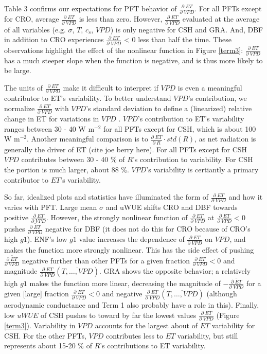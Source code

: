 \documentclass[draft,linenumbers]{agujournal}
\begin{document}
Table 3 confirms our expectations for PFT behavior of $\frac{\partial \; ET}{\partial \; VPD}$. For all PFTs except for CRO, average $\frac{\partial \; ET}{\partial \; VPD}$ is less than zero. However, $\frac{\partial \; ET}{\partial \; VPD}$ evaluated at the average of all variables (e.g. $\sigma$, $T$, $c_s$, $VPD$) is only negative for CSH and GRA. And, DBF in addition to CRO experiences $\frac{\partial \; ET}{\partial \; VPD}$ < 0 less than half the time. These observations highlight the effect of the nonlinear function in Figure \ref{term3}: $\frac{\partial \; ET}{\partial \; VPD}$ has a much steeper slope when the function is negative, and is thus more likely to be large.

The units of $\frac{\partial \; ET}{\partial \; VPD}$ make it difficult to interpret if $VPD$ is even a meaningful contributor to ET's variability. To better understand $VPD$'s contribution, we normalize $\frac{\partial \; ET}{\partial \; VPD}$ with $VPD$'s standard deviation to define a (linearized) relative change in ET for variations in $VPD$ . $VPD$'s contribution to ET's variability ranges between 30 - 40 W m$^{-2}$ for all PFTs except for CSH, which is about 100 W m$^{-2}$. Another meaningful comparison is to $\frac{\partial \; ET}{\partial \; R} \cdot std(R)$, as net radiation is generally the driver of ET (cite joe berry here). For all PFTs except for CSH $VPD$ contributes between 30 - 40 \% of $R$'s contribution to variability. For CSH the portion is much larger, about 88 \%. $VPD$'s variability is certiantly a primary contributor to $ET$'s variability.

So far, idealized plots and statistics have illuminated the form of $\frac{\partial \; ET}{\partial \; VPD}$ and how it varies with PFT. Large mean $\sigma$ and uWUE shifts CRO and DBF towards positive $\frac{\partial \; ET}{\partial \; VPD}$. However, the strongly nonlinear function of $\frac{\partial \; ET}{\partial \; VPD}$ at $\frac{\partial \; ET}{\partial \; VPD} < 0$ pushes $\overline{\frac{\partial \; ET}{\partial \; VPD}}$ negative for DBF (it does not do this for CRO because of CRO's high $g1$). ENF's low $g1$ value increases the dependence of $\frac{\partial \; ET}{\partial \; VPD}$ on $VPD$, and makes the function more strongly nonlinear. This has the side effect of pushing $\overline{\frac{\partial \; ET}{\partial \; VPD}}$ negative further than other PFTs for a given fraction $\frac{\partial \; ET}{\partial \; VPD} < 0$ and magnitude $\frac{\partial \; ET}{\partial \; VPD}(\overline{T,\ldots,VPD})$. GRA shows the opposite behavior; a relatively high $g1$  makes the function more linear, decreasing the magnitude of $-\overline{\frac{\partial \; ET}{\partial \; VPD}}$ for a given  [large] fraction $\frac{\partial \; ET}{\partial \; VPD} < 0$ and negative $\frac{\partial \; ET}{\partial \; VPD}(\overline{T,\ldots,VPD})$ (although aerodynamic conductance and Term 1 also probably have a role in this). Finally, low $uWUE$ of CSH pushes to toward by far the lowest values $\frac{\partial \; ET}{\partial \; VPD}$ (Figure \ref{term3}). Variability in $VPD$ accounts for the largest about of $ET$ variability for CSH. For the other PFTs, $VPD$ contributes less to $ET$ variability, but still represents about 15-20 \% of $R$'s contributions to ET variability.
\end{document}
